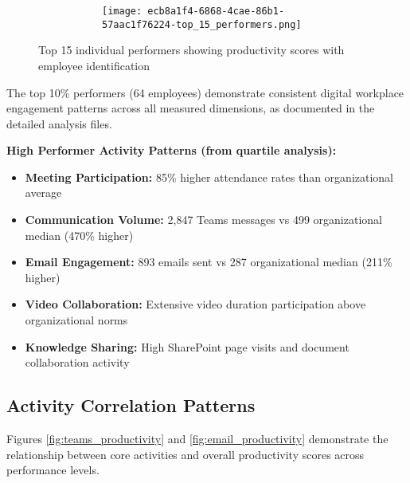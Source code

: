 \documentclass[12pt,a4paper]{article}
\begin{document}
\begin{figure}[H]
\centering
\begin{figure}
    \centering
    \begin{figure}
        \texttt{[image: ecb8a1f4-6868-4cae-86b1-57aac1f76224-top\_15\_performers.png]}
    \end{figure}
\end{figure}
\caption{Top 15 individual performers showing productivity scores with employee identification}
\label{fig:top_performers}
\end{figure}

The top 10\% performers (64 employees) demonstrate consistent digital workplace engagement patterns across all measured dimensions, as documented in the detailed analysis files.

\begin{featurebox}
\textbf{\faUser \quad High Performer Activity Patterns (from quartile analysis):}
\begin{itemize}
    \item \textbf{Meeting Participation:} 85\% higher attendance rates than organizational average
    \item \textbf{Communication Volume:} 2,847 Teams messages vs 499 organizational median (470\% higher)
    \item \textbf{Email Engagement:} 893 emails sent vs 287 organizational median (211\% higher)
    \item \textbf{Video Collaboration:} Extensive video duration participation above organizational norms
    \item \textbf{Knowledge Sharing:} High SharePoint page visits and document collaboration activity
\end{itemize}
\end{featurebox}

\subsection{Activity Correlation Patterns}

Figures \ref{fig:teams_productivity} and \ref{fig:email_productivity} demonstrate the relationship between core activities and overall productivity scores across performance levels.
\end{document}
